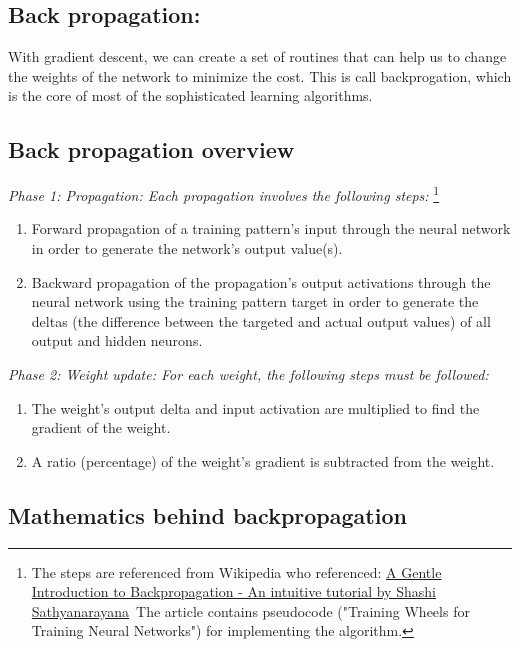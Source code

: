 \documentclass[]{article}
\begin{document}
\begin{multicols}{2}

\section{Back propagation:}

With gradient descent, we can create a set of routines that can help us
to change the weights of the network to minimize the cost. This is call backprogation, which is the core of most of the  sophisticated learning algorithms. 

\subsection{Back propagation overview}

\emph{Phase 1: Propagation: Each propagation
involves the following steps:}
\footnote{The steps are referenced from
Wikipedia who referenced:
\href{http://numericinsight.com/uploads/A_Gentle_Introduction_to_Backpropagation.pdf}{A
Gentle Introduction to Backpropagation - An intuitive tutorial by
Shashi Sathyanarayana}~The article contains pseudocode ("Training
Wheels for Training Neural Networks") for implementing the algorithm.}  

\begin{enumerate}
\def\labelenumi{\arabic{enumi}.}
\item
  Forward propagation of a training pattern's input through the neural
  network in order to generate the network's output value(s).
\item
  Backward propagation of the propagation's output activations through
  the neural network using the training pattern target in order to
  generate the deltas (the difference between the targeted and actual
  output values) of all output and hidden neurons.
\end{enumerate}

\emph{
Phase 2: Weight update: For each weight, the following
steps must be
followed:}

\begin{enumerate}
\def\labelenumi{\arabic{enumi}.}
\item
  The weight's output delta and input activation are multiplied to find
  the gradient of the weight.
\item
  A ratio (percentage) of the weight's gradient is subtracted from the
  weight.
\end{enumerate}

\subsection{Mathematics behind backpropagation}


\end{multicols}
\end{document}
